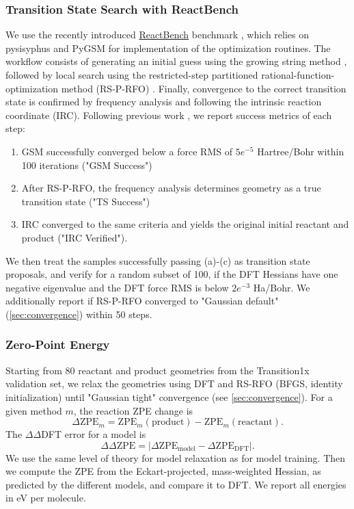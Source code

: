 \documentclass[pdflatex,sn-mathphys-num]{sn-jnl}%
\theoremstyle{thmstyleone}%
\theoremstyle{thmstyletwo}%
\theoremstyle{thmstylethree}%
\begin{document}
\begin{appendices}
\subsubsection{Transition State Search with ReactBench\label{sec:reactbench}}
We use the recently introduced \href{https://github.com/deepprinciple/ReactBench}{ReactBench} benchmark \citep{zhao2025}, which relies on pysisyphus \citep{steinmetzer2021} and PyGSM\cite{aldazZimmermanGroupPyGSM2025} for implementation of the optimization routines.
The workflow consists of generating an initial guess using the growing string method \citep{aldazZimmermanGroupPyGSM2025, zimmerman2015}, followed by local search using the restricted-step partitioned rational-function-optimization method (RS-P-RFO) \citep{RSRFO1998a}. Finally, convergence to the correct transition state is confirmed by frequency analysis and following the intrinsic reaction coordinate (IRC).
Following previous work \citep{zhao2025, cui2025horm}, we report success metrics of each step: 
\begin{enumerate}
    \item 
GSM successfully converged below a force RMS of $5e^{-5}$ Hartree/Bohr within 100 iterations ("GSM Success")
\item After RS-P-RFO, the frequency analysis determines geometry as a true transition state ("TS Success")
\item IRC converged to the same criteria and yields the original initial reactant and product ("IRC Verified").
\end{enumerate}
We then treat the samples successfully passing (a)-(c) as transition state proposals, and verify for a random subset of 100, if the DFT Hessians have one negative eigenvalue and the DFT force RMS is below $2e^{-3}$ Ha/Bohr. We additionally report if RS-P-RFO converged to "Gaussian default" (\ref{sec:convergence}) within 50 steps.

\subsubsection{Zero-Point Energy\label{sec:zpe_setup}}
Starting from 80 reactant and product geometries from the Transition1x validation set, we relax the geometries using DFT and RS-RFO (BFGS, identity initialization) until "Gaussian tight" convergence (see \ref{sec:convergence}).
For a given method $m$, the reaction ZPE change is
$$
\Delta \mathrm{ZPE}_{m}
= \mathrm{ZPE}_{m}(\text{product}) - \mathrm{ZPE}_{m}(\text{reactant}).
$$
The $\Delta\Delta$DFT error for a model is
$$
\Delta\Delta \mathrm{ZPE}
= \bigl|\Delta \mathrm{ZPE}_{\text{model}} - \Delta \mathrm{ZPE}_{\text{DFT}}\bigr|.
$$
We use the same level of theory for model relaxation as for model training.
Then we compute the ZPE from the Eckart-projected, mass-weighted Hessian, as predicted by the different models, and compare it to DFT.
We report all energies in eV per molecule. 


\end{appendices}
\end{document}
